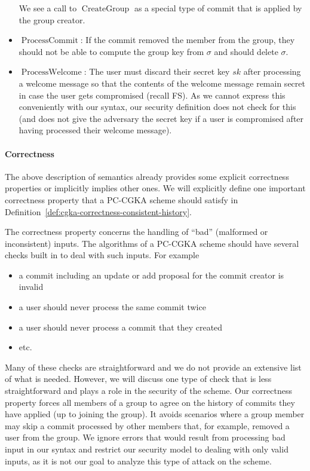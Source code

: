 \begin{itemize}
	      We see a call to $\operatorname{CreateGroup}$ as a special type of commit that is applied by the group creator.


	\item $\operatorname{ProcessCommit}$: If the commit removed the member from the group, they should not be able to compute the group key from $\sigma$ and should delete $\sigma$.
	\item $\operatorname{ProcessWelcome}$:  The user must discard their secret key $sk$ after processing a welcome message so that the contents of the welcome message remain secret in case the user gets compromised (recall FS). As we cannot express this conveniently with our syntax, our security definition does not check for this (and does not give the adversary the secret key if a user is compromised after having processed their welcome message).
\end{itemize}

\paragraph{Correctness}

The above description of semantics already provides some explicit correctness properties or implicitly implies other ones. We will explicitly define one important correctness property that a PC-CGKA scheme should satisfy in Definition~\ref{def:cgka-correctness-consistent-history}. 

The correctness property concerns the handling of ``bad'' (malformed or inconsistent) inputs. The algorithms of a PC-CGKA scheme should have several checks built in to deal with such inputs. For example
\begin{itemize}
	\item a commit including an update or add proposal for the commit creator is invalid
	\item a user should never process the same commit twice
	\item a user should never process a commit that they created
	\item etc.
\end{itemize}
Many of these checks are straightforward and we do not provide an extensive list of what is needed. However, we will discuss one type of check that is less straightforward and plays a role in the security of the scheme. Our correctness property forces all members of a group to agree on the history of commits they have applied (up to joining the group). It avoids scenarios where a group member may skip a commit processed by other members that, for example, removed a user from the group. We ignore errors that would result from processing bad input in our syntax and restrict our security model to dealing with only valid inputs, as it is not our goal to analyze this type of attack on the scheme.

